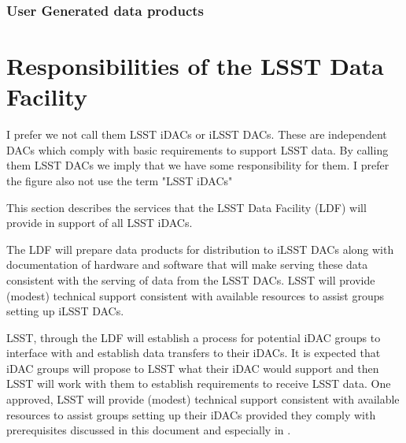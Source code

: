 \subsubsection{User Generated data products }

\section{Responsibilities of the LSST Data Facility}

{\color{red} I prefer we not call them LSST iDACs or iLSST DACs. These are independent DACs which comply with basic requirements to support LSST data. By calling them LSST DACs we imply that we have some responsibility for them. I prefer the figure also not use the term "LSST iDACs"}

This section describes the services that the LSST Data Facility (LDF) will provide in support of all LSST iDACs.

The LDF will prepare data products for distribution to iLSST DACs along with documentation of hardware and software that will make serving these data consistent with the serving of data from the LSST DACs. LSST will provide (modest) technical support consistent with available resources to assist groups setting up iLSST DACs. 

LSST, through the LDF will establish a process for potential iDAC groups to interface with and establish data transfers to their iDACs. It is expected that iDAC groups will propose to LSST what their iDAC would support and then LSST will work with them to establish requirements to receive LSST data. One approved, LSST will provide (modest) technical support consistent with available resources to assist groups setting up their iDACs provided they comply with prerequisites discussed in this document and especially in .




